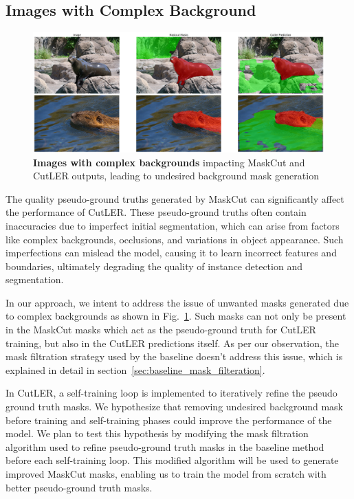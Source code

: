 \subsection{Images with Complex Background}
\begin{figure}
	\centering
	\includegraphics[width=1\textwidth]{Images/main/cutler-prob-noisy-bg.png}
	\caption[\textbf{Cutler's Performance on Images with Complex Background}]{\textbf{Images with complex backgrounds} impacting MaskCut and CutLER outputs, leading to undesired background mask generation}
	\label{fig:cutler_noisy_bg_eg}
\end{figure}

The quality pseudo-ground truths generated by MaskCut can significantly affect the performance of CutLER. These pseudo-ground truths often contain inaccuracies due to imperfect initial segmentation, which can arise from factors like complex backgrounds, occlusions, and variations in object appearance. Such imperfections can mislead the model, causing it to learn incorrect features and boundaries, ultimately degrading the quality of instance detection and segmentation.

In our approach, we intent to address the issue of unwanted masks generated due to complex backgrounds as shown in Fig.~\ref{fig:cutler_noisy_bg_eg}. Such masks can not only be present in the MaskCut masks which act as the pseudo-ground truth for CutLER training, but also in the CutLER predictions itself. As per our observation, the mask filtration strategy used by the baseline doesn't address this issue, which is explained in detail in section~\ref{sec:baseline_mask_filteration}.

In CutLER, a self-training loop is implemented to iteratively refine the pseudo ground truth masks. We hypothesize that removing undesired background mask before training and self-training phases could improve the performance of the model. We plan to test this hypothesis by modifying the mask filtration algorithm used to refine pseudo-ground truth masks in the baseline method before each self-training loop. This modified algorithm will be used to generate improved MaskCut masks, enabling us to train the model from scratch with better pseudo-ground truth masks.

